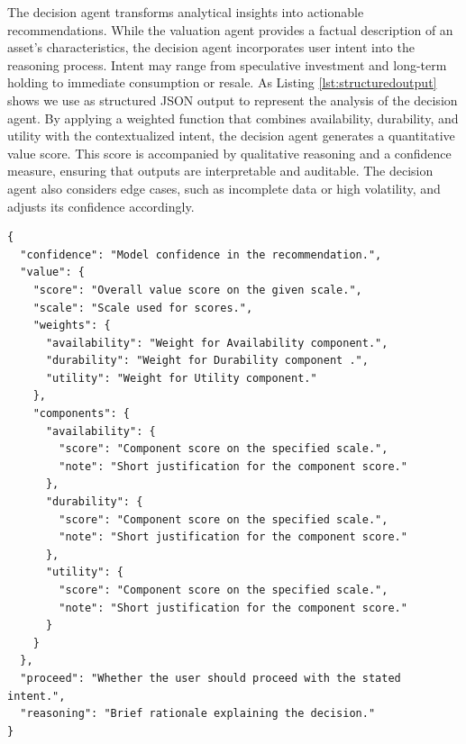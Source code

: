 The decision agent transforms analytical insights into actionable recommendations. While the valuation agent provides a factual description of an asset’s characteristics, the decision agent incorporates user intent into the reasoning process. Intent may range from speculative investment and long-term holding to immediate consumption or resale. As Listing \ref{lst:structuredoutput} shows we use as structured JSON output to represent the analysis of the decision agent. By applying a weighted function that combines availability, durability, and utility with the contextualized intent, the decision agent generates a quantitative value score. This score is accompanied by qualitative reasoning and a confidence measure, ensuring that outputs are interpretable and auditable. The decision agent also considers edge cases, such as incomplete data or high volatility, and adjusts its confidence accordingly.

\begin{lstlisting}[caption={Structured output format of decision agent}, label={lst:structuredoutput}]
{
  "confidence": "Model confidence in the recommendation.",
  "value": {
    "score": "Overall value score on the given scale.",
    "scale": "Scale used for scores.",
    "weights": {
      "availability": "Weight for Availability component.",
      "durability": "Weight for Durability component .",
      "utility": "Weight for Utility component."
    },
    "components": {
      "availability": {
        "score": "Component score on the specified scale.",
        "note": "Short justification for the component score."
      },
      "durability": {
        "score": "Component score on the specified scale.",
        "note": "Short justification for the component score."
      },
      "utility": {
        "score": "Component score on the specified scale.",
        "note": "Short justification for the component score."
      }
    }
  },
  "proceed": "Whether the user should proceed with the stated intent.",
  "reasoning": "Brief rationale explaining the decision."
}
\end{lstlisting}


